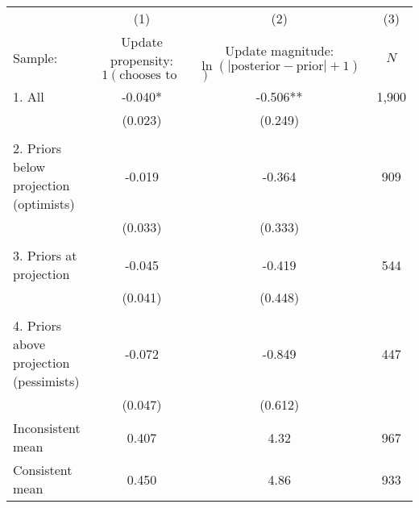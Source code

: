 \begin{tabular}{l c c c}
  \hline
  \hline
 & (1) & (2) & (3) \\ 
  Sample: & \shortstack{Update propensity: \\
  $1(\text{chooses to update})$} & \shortstack{Update magnitude: \\ $\ln(|\text{posterior} -
  \text{prior}|+1)$} & $N$ \\ 
  \hline  
1. All & -0.040* & -0.506** & 1,900 \\
  & (0.023) & (0.249) \\
  \\
2. Priors below projection (optimists) & -0.019
       & -0.364 & 
 909 \\
  & (0.033) & (0.333) \\
  \\
3. Priors at projection & -0.045 & -0.419
          & 544 \\
  & (0.041) & (0.448) \\
  \\
4. Priors above projection (pessimists) & -0.072 & -0.849
          & 447 \\
  & (0.047) & (0.612) \\
  \hline
  Inconsistent mean & 0.407 & 4.32
             & 967 \\
  Consistent mean & 0.450
       & 4.86
             & 933 \\
  \hline
  \hline
\end{tabular}

